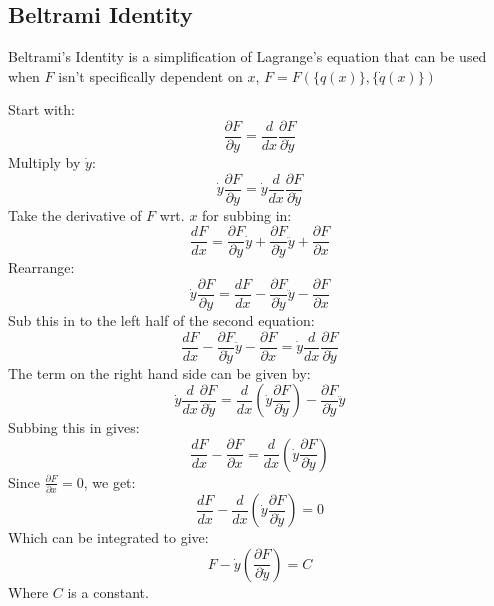 \documentclass[table,cmyk]{article}
\begin{document}
\begin{longtable}
\section*{Beltrami Identity}
    Beltrami's Identity is a simplification of Lagrange's equation that can be
    used when $F$ isn't specifically dependent on $x$, $F=F(\{q(x)\}, \{\dot q(x)\})$

    Start with:
    \begin{displaymath}
     \frac{\partial F}{\partial y} = \frac{d}{dx}\frac{\partial F}{\partial \dot
     y} 
    \end{displaymath}
    Multiply by $\dot y$:
    \begin{displaymath}
     \dot y \frac{\partial F}{\partial y}=\dot y \frac{d}{dx}\frac{\partial
       F}{\partial \dot y} 
    \end{displaymath}
    Take the derivative of $F$ wrt. $x$ for subbing in:
    \begin{displaymath}
     \frac{d F}{d x}  = \frac{\partial F}{\partial y}\dot y + \frac{\partial
       F}{\partial \dot y}\ddot y + \frac{\partial F}{\partial x}
    \end{displaymath}
    Rearrange:
    \begin{displaymath}
     \dot y \frac{\partial F}{\partial y}=\frac{dF}{dx}-\frac{\partial
       F}{\partial \dot y}\ddot y - \frac{\partial F}{\partial x} 
    \end{displaymath}
    Sub this in to the left half of the second equation:
    \begin{displaymath}
\frac{dF}{dx}-\frac{\partial
       F}{\partial \dot y}\ddot y - \frac{\partial F}{\partial x} = \dot y
     \frac{d}{dx}\frac{\partial F}{\partial \dot y}
    \end{displaymath}
    The term on the right hand side can be given by:
    \begin{displaymath}
      \dot y \frac{d}{dx}\frac{\partial F}{\partial \dot y} = \frac{d}{dx}\left(
        \dot y \frac{\partial F}{\partial \dot y} \right) - \frac{\partial
        F}{\partial \dot y} \ddot y
    \end{displaymath}
    Subbing this in gives:
    \begin{displaymath}
      \frac{dF}{dx}-\frac{\partial F}{\partial x}= \frac{d}{dx}\left( \dot y
        \frac{\partial F}{\partial \dot y} \right)
    \end{displaymath}
    Since $\frac{\partial F}{\partial x}=0$, we get:
    \begin{displaymath}
     \frac{dF}{dx}-\frac{d}{dx}\left( \dot y \frac{\partial F}{\partial \dot y} \right) =0
    \end{displaymath}
    Which can be integrated to give:
    \begin{displaymath}
     F-\dot y \left (\frac{\partial F}{\partial \dot y} \right ) = C
    \end{displaymath}
    Where $C$ is a constant.
\tabularnewline\hline

\end{longtable}
\end{document}
